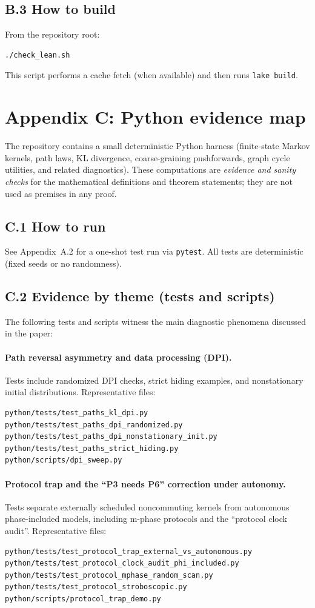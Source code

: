 \documentclass[11pt]{article}
\theoremstyle{remark}
\begin{document}
\subsection*{B.3 How to build}
From the repository root:
\begin{verbatim}
./check_lean.sh
\end{verbatim}
This script performs a cache fetch (when available) and then runs \texttt{lake build}.

\section{Appendix C: Python evidence map}
The repository contains a small deterministic Python harness (finite-state Markov kernels,
path laws, KL divergence, coarse-graining pushforwards, graph cycle utilities, and related
diagnostics). These computations are \emph{evidence and sanity checks} for the mathematical
definitions and theorem statements; they are not used as premises in any proof.

\subsection*{C.1 How to run}
See Appendix~A.2 for a one-shot test run via \texttt{pytest}. All tests are deterministic
(fixed seeds or no randomness).

\subsection*{C.2 Evidence by theme (tests and scripts)}
The following tests and scripts witness the main diagnostic phenomena discussed in the paper:

\paragraph{Path reversal asymmetry and data processing (DPI).}
Tests include randomized DPI checks, strict hiding examples, and nonstationary initial distributions.
Representative files:
\begin{verbatim}
python/tests/test_paths_kl_dpi.py
python/tests/test_paths_dpi_randomized.py
python/tests/test_paths_dpi_nonstationary_init.py
python/tests/test_paths_strict_hiding.py
python/scripts/dpi_sweep.py
\end{verbatim}

\paragraph{Protocol trap and the ``P3 needs P6'' correction under autonomy.}
Tests separate externally scheduled noncommuting kernels from autonomous phase-included models,
including m-phase protocols and the ``protocol clock audit''.
Representative files:
\begin{verbatim}
python/tests/test_protocol_trap_external_vs_autonomous.py
python/tests/test_protocol_clock_audit_phi_included.py
python/tests/test_protocol_mphase_random_scan.py
python/tests/test_protocol_stroboscopic.py
python/scripts/protocol_trap_demo.py
\end{verbatim}
\end{document}
